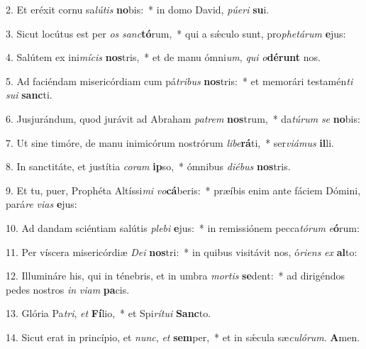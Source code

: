 
2. Et eréxit cornu sa\textit{lú}\textit{tis} \textbf{no}bis:~* in domo David, \textit{pú}\textit{e}\textit{ri} \textbf{su}i.

3. Sicut locútus est per \textit{os} \textit{sanc}\textbf{tó}rum,~* qui a s\'{\ae}culo sunt, pro\textit{phe}\textit{tá}\textit{rum} \textbf{e}jus:

4. Salútem ex ini\textit{mí}\textit{cis} \textbf{nos}tris,~* et de manu ómni\textit{um}, \textit{qui} \textit{o}\textbf{dé}\textbf{runt} nos.

5. Ad faciéndam misericórdiam cum pá\textit{tri}\textit{bus} \textbf{nos}tris:~* et memorári testamén\textit{ti} \textit{su}\textit{i} \textbf{sanc}ti.

6. Jusjurándum, quod jurávit ad Abraham \textit{pa}\textit{trem} \textbf{nos}trum,~* da\textit{tú}\textit{rum} \textit{se} \textbf{no}bis:

7. Ut sine timóre, de manu inimicórum nostrórum \textit{li}\textit{be}\textbf{rá}ti,~* ser\textit{vi}\textit{á}\textit{mus} \textbf{il}li.

8. In sanctitáte, et justítia \textit{co}\textit{ram} \textbf{ip}so,~* ómnibus \textit{di}\textit{é}\textit{bus} \textbf{nos}tris.

9. Et tu, puer, Prophéta Altíssi\textit{mi} \textit{vo}\textbf{cá}beris:~* præíbis enim ante fáciem Dómini, pará\textit{re} \textit{vi}\textit{as} \textbf{e}jus:

10. Ad dandam sciéntiam salútis \textit{ple}\textit{bi} \textbf{e}jus:~* in remissiónem pecca\textit{tó}\textit{rum} \textit{e}\textbf{ó}rum:

11. Per víscera misericórdiæ \textit{De}\textit{i} \textbf{nos}tri:~* in quibus visitávit nos, ó\textit{ri}\textit{ens} \textit{ex} \textbf{al}to:

12. Illumináre his, qui in ténebris, et in umbra \textit{mor}\textit{tis} \textbf{se}dent:~* ad dirigéndos pedes nostros \textit{in} \textit{vi}\textit{am} \textbf{pa}cis.

13. Glória Pa\textit{tri}, \textit{et} \textbf{Fí}lio,~* et Spi\textit{rí}\textit{tu}\textit{i} \textbf{Sanc}to.

14. Sicut erat in princípio, et \textit{nunc}, \textit{et} \textbf{sem}per,~* et in s\'{\ae}cula sæ\textit{cu}\textit{ló}\textit{rum}. \textbf{A}men.